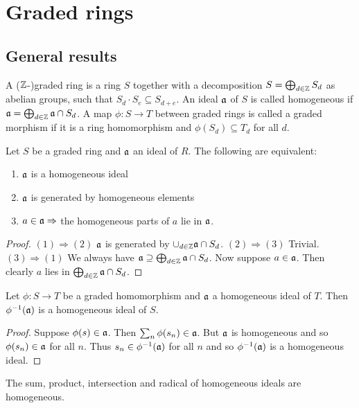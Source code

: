 \documentclass{memoir}
\begin{document}
\section{Graded rings}
\subsection{General results}
\begin{definition}
    A ($\mathbb{Z}$-)graded ring is a ring $S$ together with a decomposition $S = \bigoplus_{d\in\mathbb{Z}}S_d$ as abelian groups, such that $S_d\cdot S_e\subseteq S_{d+e}$.
    An ideal $\mathfrak{a}$ of $S$ is called homogeneous if $\mathfrak{a} = \bigoplus_{d\in\mathbb{Z}}\mathfrak{a}\cap S_d$.
    A map $\phi:S\to T$ between graded rings is called a graded morphism if it is a ring homomorphism and $\phi(S_d)\subseteq T_d$ for all $d$.
\end{definition}
\begin{proposition}
    Let $S$ be a graded ring and $\mathfrak{a}$ an ideal of $R$.
    The following are equivalent:
    \begin{enumerate}
        \item $\mathfrak{a}$ is a homogeneous ideal
        \item $\mathfrak{a}$ is generated by homogeneous elements
        \item $a\in\mathfrak{a}\Rightarrow$ the homogeneous parts of $a$ lie in $\mathfrak{a}$.
    \end{enumerate}
\end{proposition}
\begin{proof}
    $(1)\Rightarrow(2)$ $\mathfrak{a}$ is generated by $\cup_{d\in\mathbb{Z}}\mathfrak{a}\cap S_d$. 
    $(2)\Rightarrow(3)$ Trivial. 
    $(3)\Rightarrow(1)$ We always have $\mathfrak{a} \supseteq \bigoplus_{d\in\mathbb{Z}}\mathfrak{a}\cap S_d$.
    Now suppose $a\in \mathfrak{a}$.
    Then clearly $a$ lies in $\bigoplus_{d\in\mathbb{Z}}\mathfrak{a}\cap S_d$.
\end{proof}
\begin{proposition}
    Let $\phi:S\to T$ be a graded homomorphism and $\mathfrak{a}$ a homogeneous ideal of $T$.
    Then $\phi^{-1}(\mathfrak{a})$ is a homogeneous ideal of $S$.
\end{proposition}
\begin{proof}
    Suppose $\phi(s) \in \mathfrak{a}$.
    Then $\sum_n\phi(s_n) \in \mathfrak{a}$.
    But $\mathfrak{a}$ is homogeneous and so $\phi(s_n)\in \mathfrak{a}$ for all $n$.
    Thus $s_n\in \phi^{-1}(\mathfrak{a})$ for all $n$ and so $\phi^{-1}(\mathfrak{a})$ is a homogeneous ideal.
\end{proof}
\begin{proposition}
    The sum, product, intersection and radical of homogeneous ideals are homogeneous.
\end{proposition}
\end{document}
